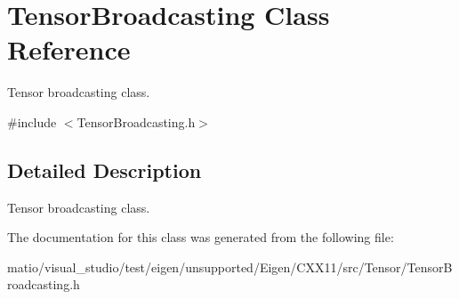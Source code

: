 \hypertarget{class_tensor_broadcasting}{}\section{Tensor\+Broadcasting Class Reference}
\label{class_tensor_broadcasting}


Tensor broadcasting class.  




{\ttfamily \#include $<$Tensor\+Broadcasting.\+h$>$}



\subsection{Detailed Description}
Tensor broadcasting class. 

The documentation for this class was generated from the following file\+:\begin{DoxyCompactItemize}
\item 
matio/visual\+\_\+studio/test/eigen/unsupported/\+Eigen/\+C\+X\+X11/src/\+Tensor/\+Tensor\+Broadcasting.\+h\end{DoxyCompactItemize}
